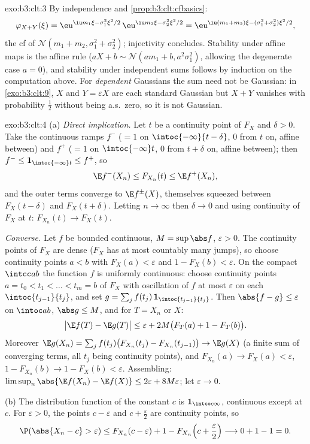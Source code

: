 \begin{solution}{exo:b3:clt:3}
By independence and \cref{prop:b3:clt:cfbasics}:
\[
\varphi_{X+Y}(\xi) = \eu^{\iu m_1\xi - \sigma_1^2\xi^2/2}\,
\eu^{\iu m_2\xi - \sigma_2^2\xi^2/2}
= \eu^{\iu(m_1+m_2)\xi - (\sigma_1^2+\sigma_2^2)\xi^2/2},
\]
the cf of $\mathcal N(m_1 + m_2, \sigma_1^2 + \sigma_2^2)$;
injectivity concludes. Stability under affine maps is the
affine rule ($aX + b \sim \mathcal N(am_1 + b,
a^2\sigma_1^2)$, allowing the degenerate case $a = 0$), and
stability under independent sums follows by induction on the
computation above. For \emph{dependent} Gaussians the sum
need not be Gaussian: in \cref{exo:b3:clt:9}, $X$ and $Y =
\varepsilon X$ are each standard Gaussian but $X + Y$
vanishes with probability $\frac12$ without being a.s.\
zero, so it is not Gaussian.
\end{solution}

\begin{solution}{exo:b3:clt:4}
(a) \emph{Direct implication.} Let $t$ be a continuity point
of $F_X$ and $\delta > 0$. Take the continuous ramps
$f^-$ ($= 1$ on $\intoc{-\infty}{t-\delta}$, $0$ from $t$
on, affine between) and $f^+$ ($= 1$ on $\intoc{-\infty}t$,
$0$ from $t + \delta$ on, affine between); then $f^- \leq
\mathbf 1_{\intoc{-\infty}t} \leq f^+$, so
\[
\E f^-(X_n) \leq F_{X_n}(t) \leq \E f^+(X_n),
\]
and the outer terms converge to $\E f^\pm(X)$, themselves
squeezed between $F_X(t - \delta)$ and $F_X(t + \delta)$.
Letting $n \to \infty$ then $\delta \to 0$ and using
continuity of $F_X$ at $t$: $F_{X_n}(t) \to F_X(t)$.

\emph{Converse.} Let $f$ be bounded continuous, $M =
\sup\abs f$, $\varepsilon > 0$. The continuity points of
$F_X$ are dense ($F_X$ has at most countably many jumps), so
choose continuity points $a < b$ with $F_X(a) < \varepsilon$
and $1 - F_X(b) < \varepsilon$. On the compact $\intcc ab$
the function $f$ is uniformly continuous: choose continuity
points $a = t_0 < t_1 < \dots < t_m = b$ of $F_X$ with
oscillation of $f$ at most $\varepsilon$ on each
$\intoc{t_{j-1}}{t_j}$, and set $g = \sum_j
f(t_j)\,\mathbf 1_{\intoc{t_{j-1}}{t_j}}$. Then $\abs{f - g}
\leq \varepsilon$ on $\intoc ab$, $\abs g \leq M$, and for
$T = X_n$ or $X$:
\[
\bigl|\E f(T) - \E g(T)\bigr| \leq \varepsilon +
2M\bigl(F_T(a) + 1 - F_T(b)\bigr).
\]
Moreover $\E g(X_n) = \sum_j f(t_j)\bigl(F_{X_n}(t_j) -
F_{X_n}(t_{j-1})\bigr) \to \E g(X)$ (a finite sum of
converging terms, all $t_j$ being continuity points), and
$F_{X_n}(a) \to F_X(a) < \varepsilon$, $1 - F_{X_n}(b) \to 1
- F_X(b) < \varepsilon$. Assembling:
$\limsup_n\abs{\E f(X_n) - \E f(X)} \leq 2\varepsilon +
8M\varepsilon$; let $\varepsilon \to 0$.

(b) The distribution function of the constant $c$ is
$\mathbf 1_{\intco c\infty}$, continuous except at $c$. For
$\varepsilon > 0$, the points $c - \varepsilon$ and $c +
\frac\varepsilon2$ are continuity points, so
\[
\P(\abs{X_n - c} > \varepsilon) \leq F_{X_n}(c -
\varepsilon) + 1 - F_{X_n}\Bigl(c + \frac\varepsilon2\Bigr)
\longrightarrow 0 + 1 - 1 = 0 .
\]
\end{solution}

